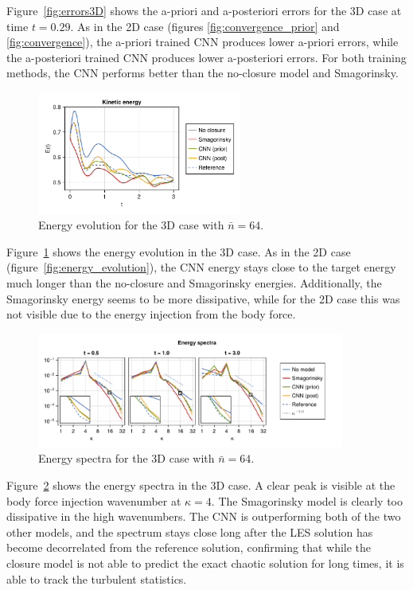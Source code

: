 \documentclass[preprint]{elsarticle}
\begin{document}
Figure~\ref{fig:errors3D} shows the a-priori and a-posteriori errors for the 3D
case at time $t = 0.29$. As in the 2D case (figures \ref{fig:convergence_prior}
and \ref{fig:convergence}), the a-priori trained CNN produces lower a-priori
errors, while the a-posteriori trained CNN produces lower a-posteriori errors.
For both training methods, the CNN performs better than the no-closure model and
Smagorinsky.

\begin{figure}
    \centering
    \includegraphics[width=0.6\textwidth]{figures_kolmogorov3D_energy_evolution_nles=64.pdf}
    \caption{Energy evolution for the 3D case with $\bar{n} = 64$.}
    \label{fig:energy_evolution3D}
\end{figure}

Figure~\ref{fig:energy_evolution3D} shows the energy evolution in the 3D case.
As in the 2D case (figure~\ref{fig:energy_evolution}),
the CNN energy stays close to the target energy much longer
than the no-closure and Smagorinsky energies. Additionally, the Smagorinsky
energy seems to be more dissipative, while for the 2D case this was not visible
due to the energy injection from the body force.

\begin{figure}
    \centering
    \includegraphics[width=0.9\textwidth]{figures_kolmogorov3D_spectra_filter=FaceAverage_nles=64.pdf}
    \caption{Energy spectra for the 3D case with $\bar{n} = 64$.}
    \label{fig:spectra3D}
\end{figure}

Figure~\ref{fig:spectra3D} shows the energy spectra in the 3D case.
A clear peak is visible at the body force injection wavenumber at $\kappa = 4$.
The Smagorinsky model is clearly too dissipative in
the high wavenumbers. The CNN is outperforming both of the two other models, and
the spectrum stays close long after the LES solution has become decorrelated
from the reference solution, confirming that while the closure model is not able
to predict the exact chaotic solution for long times, it is able to track the
turbulent statistics.
\end{document}
